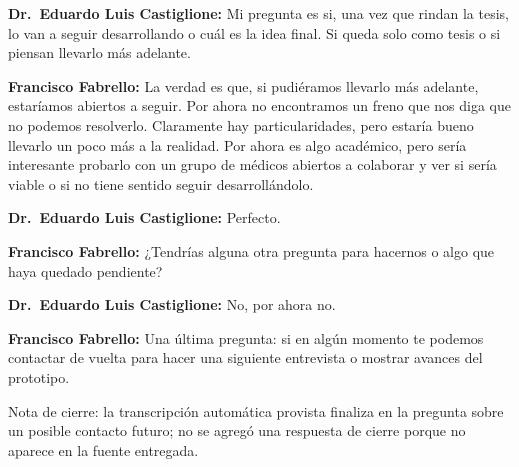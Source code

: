 \noindent\textbf{Dr.~Eduardo Luis Castiglione:} Mi pregunta es si, una vez que rindan la tesis, lo van a seguir desarrollando o cuál es la idea final. Si queda solo como tesis o si piensan llevarlo más adelante.

\noindent\textbf{Francisco Fabrello:} La verdad es que, si pudiéramos llevarlo más adelante, estaríamos abiertos a seguir. Por ahora no encontramos un freno que nos diga que no podemos resolverlo. Claramente hay particularidades, pero estaría bueno llevarlo un poco más a la realidad. Por ahora es algo académico, pero sería interesante probarlo con un grupo de médicos abiertos a colaborar y ver si sería viable o si no tiene sentido seguir desarrollándolo.

\noindent\textbf{Dr.~Eduardo Luis Castiglione:} Perfecto.

\noindent\textbf{Francisco Fabrello:} ¿Tendrías alguna otra pregunta para hacernos o algo que haya quedado pendiente?

\noindent\textbf{Dr.~Eduardo Luis Castiglione:} No, por ahora no.

\noindent\textbf{Francisco Fabrello:} Una última pregunta: si en algún momento te podemos contactar de vuelta para hacer una siguiente entrevista o mostrar avances del prototipo.

\noindent Nota de cierre: la transcripción automática provista finaliza en la pregunta sobre un posible contacto futuro; no se agregó una respuesta de cierre porque no aparece en la fuente entregada.
